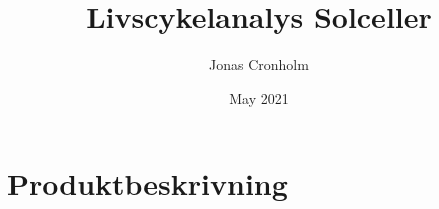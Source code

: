 \documentclass{article}
\title{Livscykelanalys Solceller}
\author{Jonas Cronholm}
\date{May 2021}
\begin{document}
	\maketitle
	\pagebreak
	\tableofcontents
	\pagebreak
	
\section{Produktbeskrivning}
  


\end{document}
